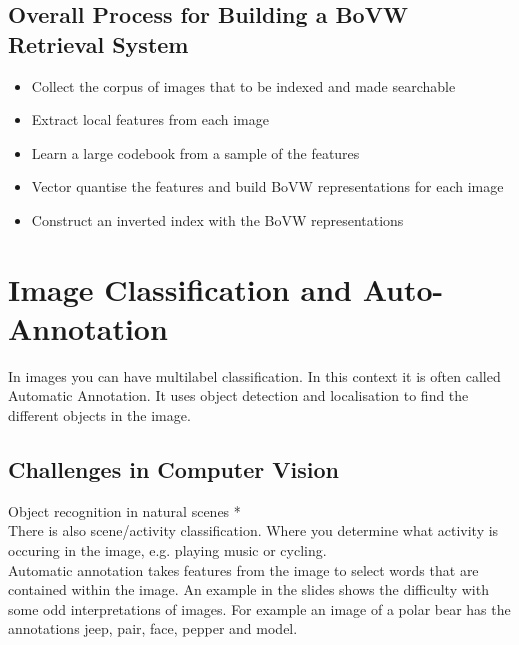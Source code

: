 \documentclass{article}
\begin{document}
	\subsection*{Overall Process for Building a BoVW Retrieval System}
	\begin{itemize}
		\item Collect the corpus of images that to be indexed and made searchable
		\item Extract local features from each image
		\item Learn a large codebook from a sample of the features
		\item Vector quantise the features and build BoVW representations for each image
		\item Construct an inverted index with the BoVW representations
	\end{itemize}
	
	\newpage
	\section*{Image Classification and Auto-Annotation}
	\pagestyle{headings}
	In images you can have multilabel classification. In this context it is often called Automatic Annotation. It uses object detection and localisation to find the different objects in the image.
	
	\subsection*{Challenges in Computer Vision}
	Object recognition in natural scenes * \\
	There is also scene/activity classification. Where you determine what activity is occuring in the image, e.g. playing music or cycling.\\
	Automatic annotation takes features from the image to select words that are contained within the image. An example in the slides shows the difficulty with some odd interpretations of images. For example an image of a polar bear has the annotations jeep, pair, face, pepper and model.
\end{document}
